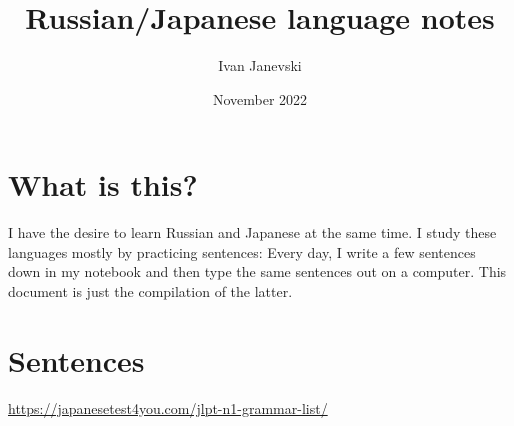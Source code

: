 \documentclass{report}
\title{Russian/Japanese language notes}
\author{Ivan Janevski}
\date{November 2022}
\begin{document}
\maketitle
\tableofcontents{}
\chapter{What is this?}
I have the desire to learn Russian and Japanese at the same time. I study these languages mostly by practicing sentences: Every day, I write a few sentences down in my notebook and then type the same sentences out on a computer. This document is just the compilation of the latter.
\chapter{Sentences}
\url{https://japanesetest4you.com/jlpt-n1-grammar-list/}











\end{document}
